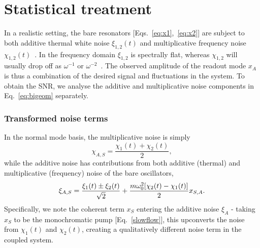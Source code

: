 \section{Statistical treatment} \label{sec:spins_stochastic}
In a realistic setting, the bare resonators [Eqs.~\eqref{eq:x1},~\eqref{eq:x2}] are subject to both additive thermal white noise $\xi_{1,2}(t)$ and multiplicative frequency noise $\chi_{1,2}(t)$~\cite{Cleland_2002}. In the frequency domain $\xi_{1,2}$ is spectrally flat, whereas $\chi_{1,2}$ will usually drop off as $\omega^{-1}$ or $\omega^{-2}$~\cite{Fong_2012}. The observed amplitude of the readout mode $x_A$ is thus a combination of the desired signal and fluctuations in the system. To obtain the SNR, we analyse the additive and multiplicative noise components in Eq.~\eqref{eq:bigeom} separately.

\subsubsection{Transformed noise terms} 
In the normal mode basis, the multiplicative noise is simply
\begin{equation}
\chi_{A,S} = \frac{\chi_1(t) + \chi_2(t)}{2},
\end{equation}
while the additive noise has contributions from both additive (thermal) and multiplicative (frequency) noise of the bare oscillators,
\begin{equation}
\xi_{A,S} = \frac{\xi_1(t)\pm\xi_2(t)}{\sqrt{2}}+ \frac{m\omega_0^2[\chi_2(t) - \chi_1(t)] }{2} x_{S,A}. \\
\end{equation}
Specifically, we note the coherent term $x_S$ entering the additive noise $\xi_A$ - taking $x_S$ to be the monochromatic pump [Eq.~\eqref{slowflow}], this upconverts the noise from $\chi_1(t)$ and $\chi_2(t)$, creating a qualitatively different noise term in the coupled system.

